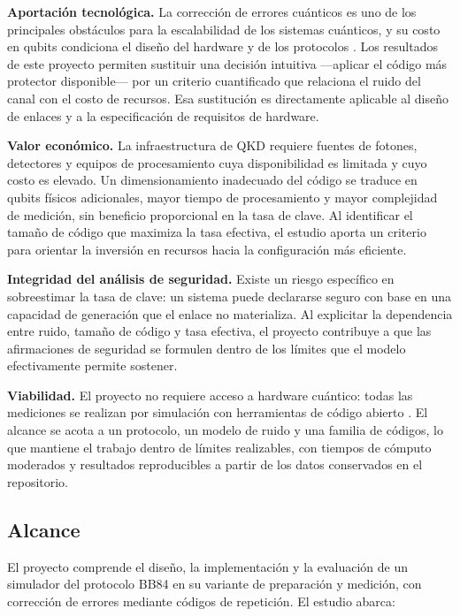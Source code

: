 \documentclass[12pt]{report}
\begin{document}
\textbf{Aportación tecnológica.} La corrección de errores cuánticos es uno de los
principales obstáculos para la escalabilidad de los sistemas cuánticos, y su
costo en qubits condiciona el diseño del hardware y de los protocolos
\citep{fowler2012, terhal2015}. Los resultados de este proyecto permiten
sustituir una decisión intuitiva —aplicar el código más protector disponible— por
un criterio cuantificado que relaciona el ruido del canal con el costo de
recursos. Esa sustitución es directamente aplicable al diseño de enlaces y a la
especificación de requisitos de hardware.

\textbf{Valor económico.} La infraestructura de QKD requiere fuentes de fotones,
detectores y equipos de procesamiento cuya disponibilidad es limitada y cuyo
costo es elevado. Un dimensionamiento inadecuado del código se traduce en qubits
físicos adicionales, mayor tiempo de procesamiento y mayor complejidad de
medición, sin beneficio proporcional en la tasa de clave. Al identificar el
tamaño de código que maximiza la tasa efectiva, el estudio aporta un criterio
para orientar la inversión en recursos hacia la configuración más eficiente.

\textbf{Integridad del análisis de seguridad.} Existe un riesgo específico en
sobreestimar la tasa de clave: un sistema puede declararse seguro con base en una
capacidad de generación que el enlace no materializa. Al explicitar la dependencia
entre ruido, tamaño de código y tasa efectiva, el proyecto contribuye a que las
afirmaciones de seguridad se formulen dentro de los límites que el modelo
efectivamente permite sostener.

\textbf{Viabilidad.} El proyecto no requiere acceso a hardware cuántico: todas
las mediciones se realizan por simulación con herramientas de código abierto
\citep{qutip2012}. El alcance se acota a un protocolo, un modelo de ruido y una
familia de códigos, lo que mantiene el trabajo dentro de límites realizables,
con tiempos de cómputo moderados y resultados reproducibles a partir de los datos
conservados en el repositorio.

\subsection{Alcance}

El proyecto comprende el diseño, la implementación y la evaluación de un
simulador del protocolo BB84 en su variante de preparación y medición, con
corrección de errores mediante códigos de repetición. El estudio abarca:
\end{document}

